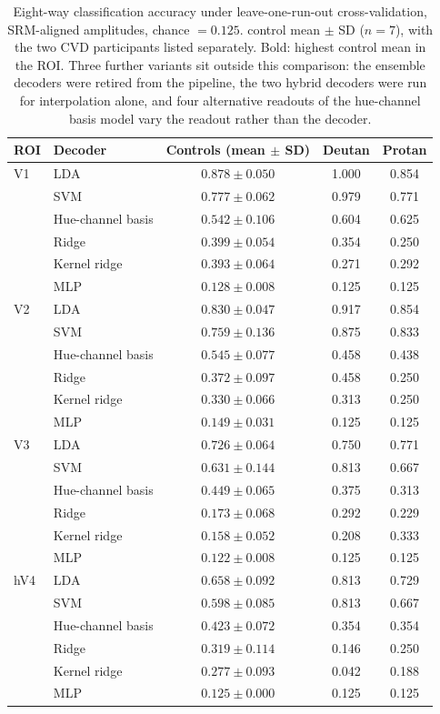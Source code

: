 \begin{table}[h]
\centering
\caption{Eight-way classification accuracy under leave-one-run-out cross-validation, SRM-aligned amplitudes, chance $= 0.125$. control mean $\pm$ SD ($n = 7$), with the two CVD participants listed separately. Bold: highest control mean in the ROI. Three further variants sit outside this comparison: the ensemble decoders were retired from the pipeline, the two hybrid decoders were run for interpolation alone, and four alternative readouts of the hue-channel basis model vary the readout rather than the decoder.}
\label{tab:loro_decoders}
\begin{tabular}{llccc}
\toprule
ROI & Decoder & Controls (mean $\pm$ SD) & Deutan & Protan \\
\midrule
V1 & LDA & $\mathbf{0.878 \pm 0.050}$ & 1.000 & 0.854 \\
   & SVM & $0.777 \pm 0.062$ & 0.979 & 0.771 \\
   & Hue-channel basis & $0.542 \pm 0.106$ & 0.604 & 0.625 \\
   & Ridge & $0.399 \pm 0.054$ & 0.354 & 0.250 \\
   & Kernel ridge & $0.393 \pm 0.064$ & 0.271 & 0.292 \\
   & MLP & $0.128 \pm 0.008$ & 0.125 & 0.125 \\
\midrule
V2 & LDA & $\mathbf{0.830 \pm 0.047}$ & 0.917 & 0.854 \\
   & SVM & $0.759 \pm 0.136$ & 0.875 & 0.833 \\
   & Hue-channel basis & $0.545 \pm 0.077$ & 0.458 & 0.438 \\
   & Ridge & $0.372 \pm 0.097$ & 0.458 & 0.250 \\
   & Kernel ridge & $0.330 \pm 0.066$ & 0.313 & 0.250 \\
   & MLP & $0.149 \pm 0.031$ & 0.125 & 0.125 \\
\midrule
V3 & LDA & $\mathbf{0.726 \pm 0.064}$ & 0.750 & 0.771 \\
   & SVM & $0.631 \pm 0.144$ & 0.813 & 0.667 \\
   & Hue-channel basis & $0.449 \pm 0.065$ & 0.375 & 0.313 \\
   & Ridge & $0.173 \pm 0.068$ & 0.292 & 0.229 \\
   & Kernel ridge & $0.158 \pm 0.052$ & 0.208 & 0.333 \\
   & MLP & $0.122 \pm 0.008$ & 0.125 & 0.125 \\
\midrule
hV4 & LDA & $\mathbf{0.658 \pm 0.092}$ & 0.813 & 0.729 \\
   & SVM & $0.598 \pm 0.085$ & 0.813 & 0.667 \\
   & Hue-channel basis & $0.423 \pm 0.072$ & 0.354 & 0.354 \\
   & Ridge & $0.319 \pm 0.114$ & 0.146 & 0.250 \\
   & Kernel ridge & $0.277 \pm 0.093$ & 0.042 & 0.188 \\
   & MLP & $0.125 \pm 0.000$ & 0.125 & 0.125 \\
\bottomrule
\end{tabular}
\end{table}

